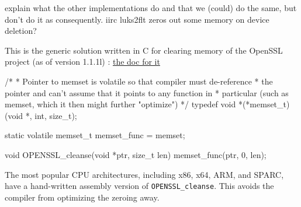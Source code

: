  explain what the other implementations do and that we (could) do the same, but don't do it as consequently. iirc luks2flt zeros out some memory on device deletion?





This is the generic solution written in C for clearing memory of the OpenSSL project (as of version 1.1.1l) : \href{https://www.openssl.org/docs/man1.1.1/man3/OPENSSL_cleanse.html}{the doc for it}
\begin{ccode}
/*
 * Pointer to memset is volatile so that compiler must de-reference
 * the pointer and can't assume that it points to any function in
 * particular (such as memset, which it then might further "optimize")
 */
typedef void *(*memset_t)(void *, int, size_t);

static volatile memset_t memset_func = memset;

void OPENSSL_cleanse(void *ptr, size_t len)
{
    memset_func(ptr, 0, len);
}
\end{ccode}
The most popular CPU architectures, including x86, x64, ARM, and SPARC, have a hand-written assembly version of \texttt{OPENSSL\_cleanse}. This avoids the compiler from optimizing the zeroing away.